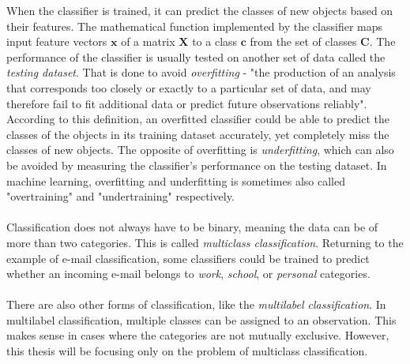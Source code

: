 \documentclass[11pt]{article}
\begin{document}
      When the classifier is trained, it can predict the classes of new objects based on their features. The mathematical function implemented by the classifier maps input feature vectors $\mathbf{x}$ of a matrix $\mathbf{X}$ to a class $\mathbf{c}$ from the set of classes $\mathbf{C}$. The performance of the classifier is usually tested on another set of data called the {\it testing dataset}. That is done to avoid {\it overfitting} - "the production of an analysis that corresponds too closely or exactly to a particular set of data, and may therefore fail to fit additional data or predict future observations reliably". \cite{oxford} According to this definition, an overfitted classifier could be able to predict the classes of the objects in its training dataset accurately, yet completely miss the classes of new objects. The opposite of overfitting is {\it underfitting}, which can also be avoided by measuring the classifier's performance on the testing dataset. In machine learning, overfitting and underfitting is sometimes also called "overtraining" and "undertraining" respectively.
      \\~\\
      Classification does not always have to be binary, meaning the data can be of more than two categories. This is called {\it multiclass classification}. Returning to the example of e-mail classification, some classifiers could be trained to predict whether an incoming e-mail belongs to {\it work}, {\it school}, or {\it personal} categories.
      \\~\\
      There are also other forms of classification, like the {\it multilabel classification}. In multilabel classification, multiple classes can be assigned to an observation. This makes sense in cases where the categories are not mutually exclusive. However, this thesis will be focusing only on the problem of multiclass classification.
\end{document}
